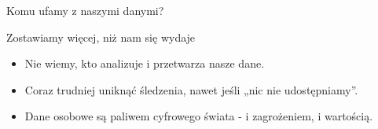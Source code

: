     
    
    
    \begin{frame}{Komu ufamy z naszymi danymi?}
    \begin{alertblock}{Zostawiamy więcej, niż nam się wydaje}
        \begin{itemize}
          \item Nie wiemy, kto analizuje i przetwarza nasze dane.
          \item Coraz trudniej uniknąć śledzenia, nawet jeśli „nic nie udostępniamy”.
          \item Dane osobowe są paliwem cyfrowego świata - i zagrożeniem, i wartością.
        \end{itemize}
    \end{alertblock}
    \end{frame}